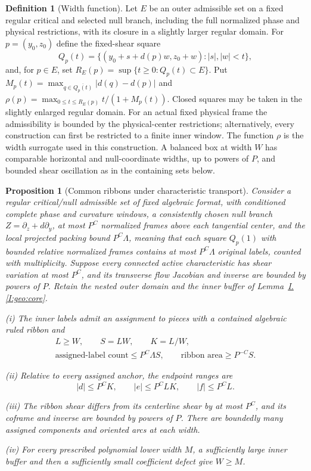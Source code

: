 \documentclass[11pt]{amsart}
\newtheorem{proposition}[theorem]{Proposition}
\theoremstyle{definition}
\newtheorem{definition}{Definition}[section]
\theoremstyle{remark}
\numberwithin{equation}{section}
\newcommand{\partIref}[1]{\hyperref[I:#1]{I.\ref*{I:#1}}}
\begin{document}
\begin{definition}[Width function]\label{def:width-function}
Let $E$ be an outer admissible set on a fixed regular critical and selected null branch, including the full normalized phase and physical restrictions, with its closure in a slightly larger regular domain. For $p=(y_0,z_0)$ define the fixed-shear square
\[
Q_p(t)=\{(y_0+s+d(p)w,z_0+w):|s|,|w|<t\},
\]
and, for $p\in E$, set $R_E(p)=\sup\{t\ge0:Q_p(t)\subset E\}$. Put $M_p(t)=\max_{q\in\overline{Q_p(t)}}|d(q)-d(p)|$ and $\rho(p)=\max_{0\le t\le R_E(p)}t/(1+M_p(t))$. Closed squares may be taken in the slightly enlarged regular domain. For an actual fixed physical frame the admissibility is bounded by the physical-center restrictions; alternatively, every construction can first be restricted to a finite inner window.
The function $\rho$ is the width surrogate used in this construction. A balanced box at width $W$ has comparable horizontal and null-coordinate widths, up to powers of $P$, and bounded shear oscillation as in the containing sets below.
\end{definition}
\begin{proposition}[Common ribbons under characteristic transport]\label{low:4:sf:common-ribbons}\label{low:5:qng:ribbons}
Consider a regular critical/null admissible set of fixed algebraic format, with conditioned complete phase and curvature windows, a consistently chosen null branch $Z=\partial_z+d\partial_y$, at most $P^C$ normalized frames above each tangential center, and the local projected packing bound $P^C\Lambda$, meaning that each square $Q_p(1)$ with bounded relative normalized frames contains at most $P^C\Lambda$ original labels, counted with multiplicity. Suppose every connected active characteristic has shear variation at most $P^C$, and its transverse flow Jacobian and inverse are bounded by powers of $P$. Retain the nested outer domain and the inner buffer of Lemma~\partIref{geo:core}.

\noindent\textup{(i)} The inner labels admit an assignment to pieces with a contained algebraic ruled ribbon and
\[
\begin{gathered}
L\ge W,\qquad S=LW,\qquad K=L/W,\\
\text{assigned-label count}\le P^C\Lambda S,\qquad \text{ribbon area}\ge P^{-C}S.
\end{gathered}
\]

\noindent\textup{(ii)} Relative to every assigned anchor, the endpoint ranges are
\[
|d|\le P^CK,\qquad |e|\le P^CLK,\qquad |f|\le P^CL.
\]

\noindent\textup{(iii)} The ribbon shear differs from its centerline shear by at most $P^C$, and its coframe and inverse are bounded by powers of $P$. There are boundedly many assigned components and oriented arcs at each width.

\noindent\textup{(iv)} For every prescribed polynomial lower width $M$, a sufficiently large inner buffer and then a sufficiently small coefficient defect give $W\ge M$.
\end{proposition}
\end{document}
